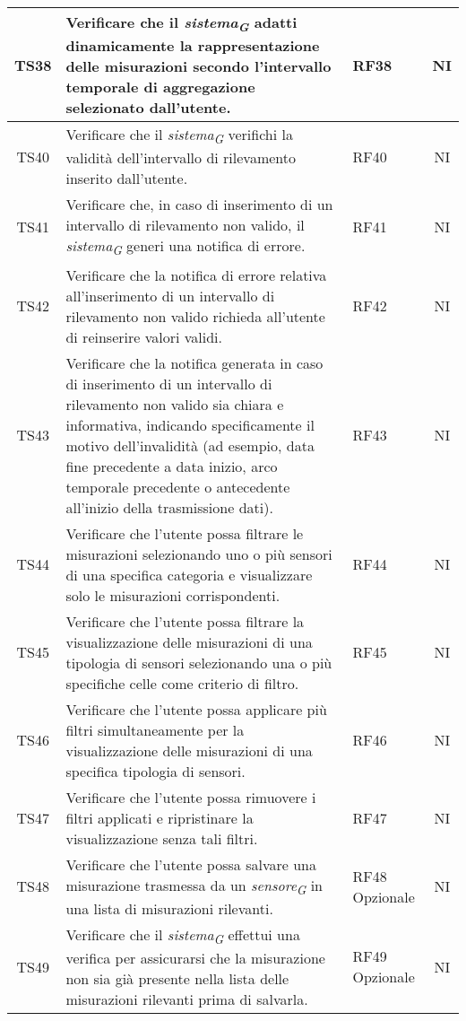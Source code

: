 \begin{longtable}{|c|p{5cm}|>{\raggedright}p{2cm}|c|}
        \hline
        TS38 & Verificare che il \textit{sistema}\textsubscript{\textit{G}} adatti dinamicamente la rappresentazione delle misurazioni secondo l'intervallo temporale di aggregazione selezionato dall'utente. & RF38 & NI \\
        \hline
        TS40 & Verificare che il \textit{sistema}\textsubscript{\textit{G}} verifichi la validità dell'intervallo di rilevamento inserito dall'utente. & RF40 & NI \\
        \hline
        TS41 & Verificare che, in caso di inserimento di un intervallo di rilevamento non valido, il \textit{sistema}\textsubscript{\textit{G}} generi una notifica di errore. & RF41 & NI \\
        \hline
        TS42 & Verificare che la notifica di errore relativa all'inserimento di un intervallo di rilevamento non valido richieda all'utente di reinserire valori validi. & RF42 & NI \\
        \hline
        TS43 & Verificare che la notifica generata in caso di inserimento di un intervallo di rilevamento non valido sia chiara e informativa, indicando specificamente il motivo dell'invalidità (ad esempio, data fine precedente a data inizio, arco temporale precedente o antecedente all’inizio della trasmissione dati). & RF43 & NI \\
        \hline
        TS44 & Verificare che l'utente possa filtrare le misurazioni selezionando uno o più sensori di una specifica categoria e visualizzare solo le misurazioni corrispondenti. & RF44 & NI \\
        \hline
        TS45 & Verificare che l'utente possa filtrare la visualizzazione delle misurazioni di una tipologia di sensori selezionando una o più specifiche celle come criterio di filtro. & RF45 & NI \\
        \hline
        TS46 & Verificare che l'utente possa applicare più filtri simultaneamente per la visualizzazione delle misurazioni di una specifica tipologia di sensori. & RF46 & NI \\
        \hline
        TS47 & Verificare che l'utente possa rimuovere i filtri applicati e ripristinare la visualizzazione senza tali filtri. & RF47 & NI \\
        \hline
        TS48 & Verificare che l'utente possa salvare una misurazione trasmessa da un \textit{sensore}\textsubscript{\textit{G}} in una lista di misurazioni rilevanti. & RF48 Opzionale & NI \\
        \hline
        TS49 & Verificare che il \textit{sistema}\textsubscript{\textit{G}} effettui una verifica per assicurarsi che la misurazione non sia già presente nella lista delle misurazioni rilevanti prima di salvarla. & RF49 Opzionale & NI \\

\end{longtable}
